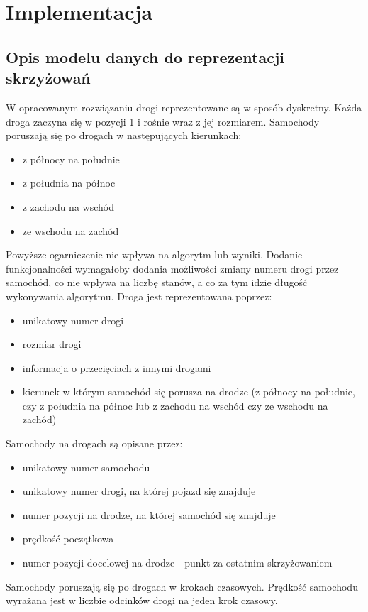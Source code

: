 \chapter{Implementacja} \label{chap:implementation}

\section{Opis modelu danych do reprezentacji skrzyżowań}

W opracowanym rozwiązaniu drogi reprezentowane są w sposób dyskretny. Każda droga zaczyna się w pozycji 1 i rośnie wraz z jej rozmiarem. Samochody poruszają się po drogach w następujących kierunkach:
\begin{itemize}
\item z północy na południe
\item z południa na północ
\item z zachodu na wschód
\item ze wschodu na zachód
\end{itemize}
Powyższe ogarniczenie nie wpływa na algorytm lub wyniki. Dodanie funkcjonalności wymagałoby dodania możliwości zmiany numeru drogi przez samochód, co nie wpływa na liczbę stanów, a co za tym idzie długość wykonywania algorytmu.
\newline
\newline
Droga jest reprezentowana poprzez:
\begin{itemize}
\item unikatowy numer drogi
\item rozmiar drogi
\item informacja o przecięciach z innymi drogami
\item kierunek w którym samochód się porusza na drodze (z północy na południe, czy z południa na północ lub z zachodu na wschód czy ze wschodu na zachód)
\end{itemize}
Samochody na drogach są opisane przez:
\begin{itemize}
\item unikatowy numer samochodu
\item unikatowy numer drogi, na której pojazd się znajduje
\item numer pozycji na drodze, na której samochód się znajduje
\item prędkość początkowa
\item numer pozycji docelowej na drodze - punkt za ostatnim skrzyżowaniem
\end{itemize}
Samochody poruszają się po drogach w krokach czasowych. Prędkość samochodu wyrażana jest w liczbie odcinków drogi na jeden krok czasowy.
